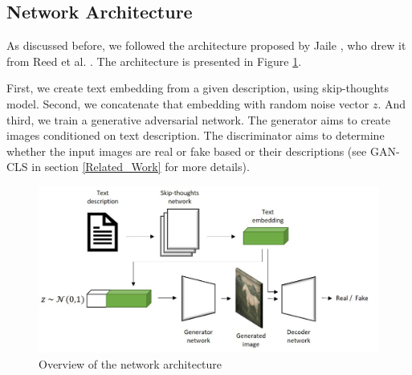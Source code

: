 \documentclass[a4paper]{article}
\begin{document}
\subsection{Network Architecture}
As discussed before, we followed the architecture proposed by Jaile \cite{Zhi2017PixelBrush}, who drew it from Reed et al. \cite{reed2016generative}. The architecture is presented in Figure \ref{fig:Network}.

First, we create text embedding from a given description, using skip-thoughts model. Second, we concatenate that embedding with random noise vector \(z\). And third, we train a generative adversarial network. The generator aims to create images conditioned on text description. The discriminator aims to determine whether the input images are real or fake based or their descriptions (see GAN-CLS in section \ref{Related_Work} for more details).

 \begin{figure}[ht]
    \centering
    \includegraphics[width=\textwidth]{network.jpg}
    \caption{Overview of the network architecture}
    \label{fig:Network}
\end{figure}
\end{document}
